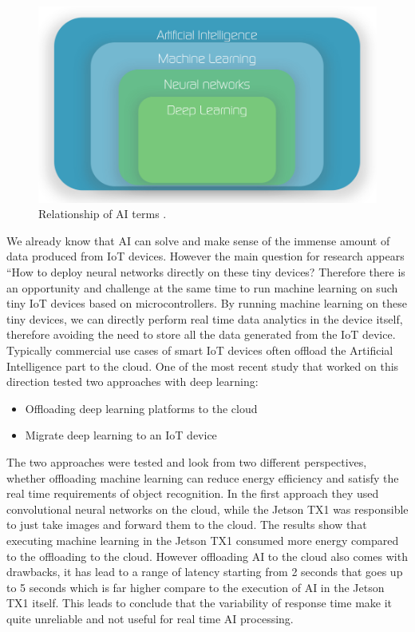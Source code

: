 \begin{figure}[!htb]
    \centering
    \includegraphics[width=1\textwidth]{figures/ai_classification.png}
    \caption{Relationship of AI terms \cite{AiMachine}.}
    \label{fig:ai_terms}
\end{figure}
We already know that AI can solve and make sense of the immense amount of data produced from IoT devices. However the main question for research appears “How to deploy neural networks directly on these tiny devices? Therefore there is an opportunity and challenge at the same time to run machine learning on such tiny IoT devices based on microcontrollers. By running machine learning on these tiny devices, we can directly perform real time data analytics in the device itself, therefore avoiding the need to store all the data generated from the IoT device. Typically commercial use cases of smart IoT devices often offload the Artificial Intelligence part to the cloud. 
One of the most recent study \cite{8057306} that worked on this direction tested two approaches with deep learning: 
\begin{itemize}
    \item Offloading deep learning platforms to the cloud
    \item Migrate deep learning to an IoT device
\end{itemize}

The two approaches were tested and look from two different perspectives,  whether offloading machine learning can reduce energy efficiency and satisfy the real time requirements of object recognition. 
In the first approach they used convolutional neural networks on the cloud, while the Jetson TX1 was responsible to just take images and forward them to the cloud. The results show that executing machine learning in the Jetson TX1 consumed more energy compared to the offloading to the cloud. However offloading AI to the cloud also comes with drawbacks, it has lead to a range of latency starting from 2 seconds that goes up to 5 seconds which is far higher compare to the execution of AI in the Jetson TX1 itself. This leads to conclude that the variability of response time make it quite unreliable and not useful for real time AI processing. 


